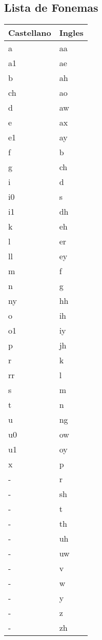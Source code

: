 \subsection{Lista de Fonemas}
\begin{center}
 \begin{tabular}{ | l | l |}
 \hline
Castellano & Ingles \\ \hline
a & aa \\ \hline
a1 & ae \\ \hline
b & ah \\ \hline
ch & ao \\ \hline
d & aw \\ \hline
e & ax \\ \hline
e1 & ay \\ \hline
f & b \\ \hline
g & ch \\ \hline
i & d \\ \hline
i0 & s \\ \hline
i1 & dh \\ \hline
k & eh \\ \hline
l & er \\ \hline
ll & ey \\ \hline
m & f \\ \hline
n & g \\ \hline
ny & hh \\ \hline
o & ih \\ \hline
o1 & iy \\ \hline
p & jh \\ \hline
r & k \\ \hline
rr & l \\ \hline
s & m \\ \hline 
t & n \\ \hline
u & ng \\ \hline
u0 & ow \\ \hline 
u1 & oy \\ \hline
x & p \\ \hline
- & r \\ \hline
- & sh \\ \hline
- &t \\ \hline
- &th \\ \hline
- &uh \\ \hline
- &uw \\ \hline
- &v \\ \hline
- &w \\ \hline
- &y \\ \hline
- &z \\ \hline
- &zh \\
    \hline
    \end{tabular}
\end{center}

